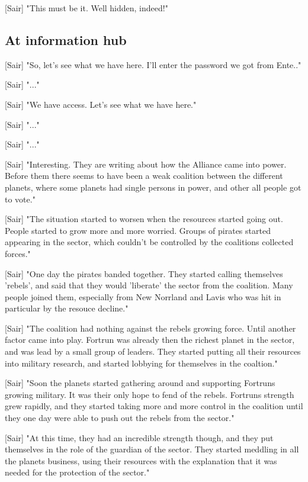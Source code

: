 \documentclass[a4paper,12pt]{article}
\begin{document}
[Sair] "This must be it. Well hidden, indeed!"

\subsection{At information hub}

[Sair] "So, let's see what we have here. I'll enter the password we got from Ente.."

[Sair] "..."

[Sair] "We have access. Let's see what we have here."

[Sair] "..."

[Sair] "..."

[Sair] "Interesting. They are writing about how the Alliance came into power. Before them there seems to have been a weak
coalition between the different planets, where some planets had single persons in power, and other all people got to vote."

[Sair] "The situation started to worsen when the resources started going out. People started to grow more and more worried.
Groups of pirates started appearing in the sector, which couldn't be controlled by the coalitions collected forces."

[Sair] "One day the pirates banded together. They started calling themselves 'rebels', and said that they would 'liberate' the sector
from the coalition. Many people joined them, especially from New Norrland and Lavis who was hit in particular by the resouce decline."

[Sair] "The coalition had nothing against the rebels growing force. Until another factor came into play. Fortrun was already then the richest planet
in the sector, and was lead by a small group of leaders. They started putting all their resources into military research, and started lobbying for themselves
in the coaltion."

[Sair] "Soon the planets started gathering around and supporting Fortruns growing military. It was their only hope to fend of the rebels. Fortruns strength grew
rapidly, and they started taking more and more control in the coalition until they one day were able to push out the rebels from the sector."

[Sair] "At this time, they had an incredible strength though, and they put themselves in the role of the guardian of the sector. They started meddling in all the planets
business, using their resources with the explanation that it was needed for the protection of the sector."
\end{document}
